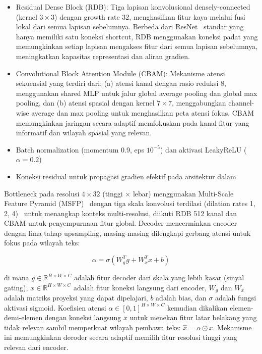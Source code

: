 \documentclass[journal]{IEEEtran}
\begin{document}
\begin{itemize}
    \item Residual Dense Block (RDB): Tiga lapisan konvolusional densely-connected (kernel $3 \times 3$) dengan growth rate 32, menghasilkan fitur kaya melalui fusi lokal dari semua lapisan sebelumnya. Berbeda dari ResNet~\cite{he2016deep} standar yang hanya memiliki satu koneksi shortcut, RDB menggunakan koneksi padat yang memungkinkan setiap lapisan mengakses fitur dari semua lapisan sebelumnya, meningkatkan kapasitas representasi dan aliran gradien.
    \item Convolutional Block Attention Module (CBAM): Mekanisme atensi sekuensial yang terdiri dari: (a) atensi kanal dengan rasio reduksi 8, menggunakan shared MLP untuk jalur global average pooling dan global max pooling, dan (b) atensi spasial dengan kernel $7 \times 7$, menggabungkan channel-wise average dan max pooling untuk menghasilkan peta atensi fokus. CBAM memungkinkan jaringan secara adaptif memfokuskan pada kanal fitur yang informatif dan wilayah spasial yang relevan.
    \item Batch normalization (momentum 0.9, eps $10^{-5}$) dan aktivasi LeakyReLU ($\alpha=0.2$)
    \item Koneksi residual untuk propagasi gradien efektif pada arsitektur dalam
\end{itemize}

Bottleneck pada resolusi $4 \times 32$ (tinggi $\times$ lebar) menggunakan Multi-Scale Feature Pyramid (MSFP)~\cite{lin2017fpn} dengan tiga skala konvolusi terdilasi (dilation rates 1, 2, 4)~\cite{chen2017deeplab} untuk menangkap konteks multi-resolusi, diikuti RDB 512 kanal dan CBAM untuk penyempurnaan fitur global. Decoder mencerminkan encoder dengan lima tahap upsampling, masing-masing dilengkapi gerbang atensi untuk fokus pada wilayah teks:

\begin{equation}
\alpha = \sigma(W_g^T g + W_x^T x + b)
\end{equation}

\noindent di mana $g \in \mathbb{R}^{H \times W \times C}$ adalah fitur decoder dari skala yang lebih kasar (sinyal gating), $x \in \mathbb{R}^{H \times W \times C}$ adalah fitur koneksi langsung dari encoder, $W_g$ dan $W_x$ adalah matriks proyeksi yang dapat dipelajari, $b$ adalah bias, dan $\sigma$ adalah fungsi aktivasi sigmoid. Koefisien atensi $\alpha \in [0,1]^{H \times W \times C}$ kemudian dikalikan elemen-demi-elemen dengan koneksi langsung $x$ untuk menekan fitur latar belakang yang tidak relevan sambil memperkuat wilayah pembawa teks: $\hat{x} = \alpha \odot x$. Mekanisme ini memungkinkan decoder secara adaptif memilih fitur resolusi tinggi yang relevan dari encoder.
\end{document}
